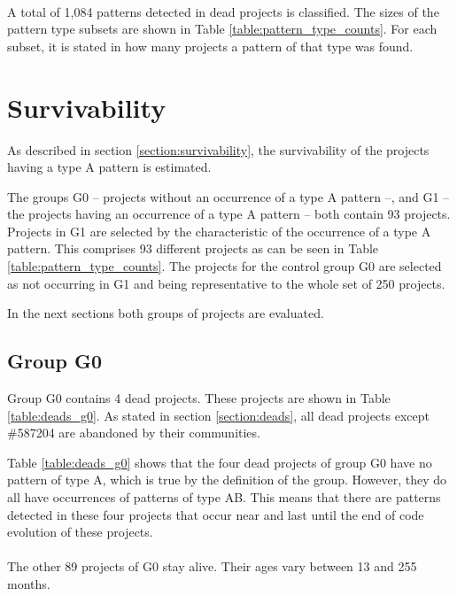 \paragraph{}
A total of 1,084 patterns detected in dead projects is classified. The sizes of
the pattern type subsets are shown in Table \ref{table:pattern_type_counts}.
For each subset, it is stated in how many projects a pattern of that type was
found.



\section{Survivability}
As described in section \ref{section:survivability}, the survivability of the
projects having a type A pattern is estimated.

The groups G0 -- projects without an occurrence of a type A pattern --, and G1
-- the projects having an occurrence of a type A pattern -- both contain 93
projects. Projects in G1 are selected by the characteristic of the occurrence
of a type A pattern. This comprises 93 different projects as can be seen in
Table \ref{table:pattern_type_counts}. The projects for the control group G0
are selected as not occurring in G1 and being representative to the whole set
of 250 projects.

In the next sections both groups of projects are evaluated.

\subsection{Group G0}
\label{section:group_g0}
Group G0 contains 4 dead projects. These projects are shown in Table
\ref{table:deads_g0}. As stated in section \ref{section:deads}, all dead
projects except \#587204 are abandoned by their communities.



\noindent
Table \ref{table:deads_g0} shows that the four dead projects of group G0 have
no pattern of type A, which is true by the definition of the group. However,
they do all have occurrences of patterns of type AB. This means that there are
patterns detected in these four projects that occur near and last until the end
of code evolution of these projects.

\paragraph{}
The other 89 projects of G0 stay alive. Their ages vary between 13 and 255
months.

